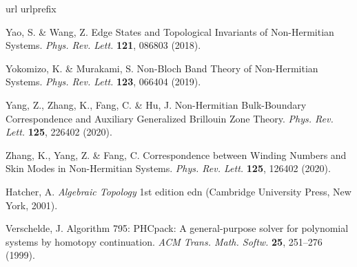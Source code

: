 \documentclass[pdflatex,sn-nature, iicol]{sn-jnl}%
\theoremstyle{thmstyleone}%
\theoremstyle{thmstyletwo}%
\theoremstyle{thmstylethree}%
\begin{document}
\begin{thebibliography}{10}
\expandafter\ifx\csname url\endcsname\relax
  \def\url#1{\burl{#1}}\fi
\expandafter\ifx\csname urlprefix\endcsname\relax\def\urlprefix{URL }\fi
\providecommand{\bibinfo}[2]{#2}
\providecommand{\eprint}[2][]{\url{#2}}
\providecommand{\doi}[1]{\url{https://doi.org/#1}}
\bibcommenthead

\bibinfo{author}{Yao, S.} \& \bibinfo{author}{Wang, Z.}
\newblock \bibinfo{title}{Edge {{States}} and {{Topological Invariants}} of {{Non-Hermitian Systems}}}.
\newblock \emph{\bibinfo{journal}{Phys. Rev. Lett.}} \textbf{\bibinfo{volume}{121}}, \bibinfo{pages}{086803} (\bibinfo{year}{2018}).

\bibinfo{author}{Yokomizo, K.} \& \bibinfo{author}{Murakami, S.}
\newblock \bibinfo{title}{Non-{{Bloch Band Theory}} of {{Non-Hermitian Systems}}}.
\newblock \emph{\bibinfo{journal}{Phys. Rev. Lett.}} \textbf{\bibinfo{volume}{123}}, \bibinfo{pages}{066404} (\bibinfo{year}{2019}).

\bibinfo{author}{Yang, Z.}, \bibinfo{author}{Zhang, K.}, \bibinfo{author}{Fang, C.} \& \bibinfo{author}{Hu, J.}
\newblock \bibinfo{title}{Non-{{Hermitian Bulk-Boundary Correspondence}} and {{Auxiliary Generalized Brillouin Zone Theory}}}.
\newblock \emph{\bibinfo{journal}{Phys. Rev. Lett.}} \textbf{\bibinfo{volume}{125}}, \bibinfo{pages}{226402} (\bibinfo{year}{2020}).

\bibinfo{author}{Zhang, K.}, \bibinfo{author}{Yang, Z.} \& \bibinfo{author}{Fang, C.}
\newblock \bibinfo{title}{Correspondence between {{Winding Numbers}} and {{Skin Modes}} in {{Non-Hermitian Systems}}}.
\newblock \emph{\bibinfo{journal}{Phys. Rev. Lett.}} \textbf{\bibinfo{volume}{125}}, \bibinfo{pages}{126402} (\bibinfo{year}{2020}).

\bibinfo{author}{Hatcher, A.}
\newblock \emph{\bibinfo{title}{Algebraic {{Topology}}}} \bibinfo{edition}{1st edition} edn (\bibinfo{publisher}{Cambridge University Press}, \bibinfo{address}{New York}, \bibinfo{year}{2001}).

\bibinfo{author}{Verschelde, J.}
\newblock \bibinfo{title}{Algorithm 795: {{PHCpack}}: A general-purpose solver for polynomial systems by homotopy continuation}.
\newblock \emph{\bibinfo{journal}{ACM Trans. Math. Softw.}} \textbf{\bibinfo{volume}{25}}, \bibinfo{pages}{251--276} (\bibinfo{year}{1999}).


\end{thebibliography}
\end{document}
